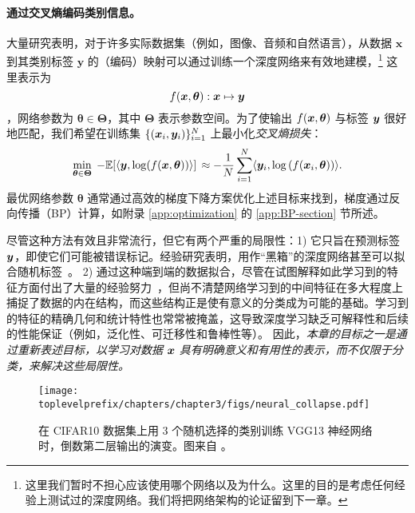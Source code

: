 \documentclass[../../book-main.tex]{subfiles}
\begin{document}
\paragraph{通过交叉熵编码类别信息。}  大量研究表明，对于许多实际数据集（例如，图像、音频和自然语言），从数据 $\bm{x}$ 到其类别标签 $\bm{y}$ 的（编码）映射可以通过训练一个深度网络来有效地建模，\footnote{这里我们暂时不担心应该使用哪个网络以及为什么。这里的目的是考虑任何经验上测试过的深度网络。我们将把网络架构的论证留到下一章。} 这里表示为 $$f(\bm{x}, \bm \theta):\bm{x} \mapsto \bm{y}$$，网络参数为 $\bm \theta \in \bm \Theta$，其中 $\bm \Theta$ 表示参数空间。为了使输出 $f(\bm{x}, \bm \theta)$ 与标签 $\bm{y}$ 很好地匹配，我们希望在训练集 $\{(\bm{x}_i, \bm{y}_i)\}_{i=1}^N$ 上最小化{\em 交叉熵损失}：
\begin{equation}
   \min_{\bm \theta \in \bm \Theta} \; - \mathbb{E}[\langle \bm{y}, \log(f(\bm{x}, \bm \theta)) \rangle] \, \approx - \frac{1}{N}\sum_{i=1}^N \langle \bm{y}_i, \log\left(f(\bm{x}_i, \bm \theta)\right) \rangle.
   \label{chap4-eqn:cross-entropy}
\end{equation}
最优网络参数 $\bm \theta $ 通常通过高效的梯度下降方案优化上述目标来找到，梯度通过反向传播（BP）计算，如附录 \ref{app:optimization} 的 \ref{app:BP-section} 节所述。

尽管这种方法有效且非常流行，但它有两个严重的局限性：1) 它只旨在预测标签 $\bm{y}$，即使它们可能被错误标记。经验研究表明，用作“黑箱”的深度网络甚至可以拟合随机标签~\cite{zhang2017understanding}。
2) 通过这种端到端的数据拟合，尽管在试图解释如此学习到的特征方面付出了大量的经验努力~\cite{Zeiler-ECCV2014}，但尚不清楚网络学习到的中间特征在多大程度上捕捉了数据的内在结构，而这些结构正是使有意义的分类成为可能的基础。学习到的特征的精确几何和统计特性也常常被掩盖，这导致深度学习缺乏可解释性和后续的性能保证（例如，泛化性、可迁移性和鲁棒性等）。
因此，{\em 本章的目标之一是通过重新表述目标，以学习对数据 $\bm{x}$ 具有明确意义和有用性的表示，而不仅限于分类，来解决这些局限性。}

\begin{figure}
	\centering
	\texttt{[image: \\toplevelprefix/chapters/chapter3/figs/neural\_collapse.pdf]}
	\caption{在 CIFAR10 数据集上用 3 个随机选择的类别训练 VGG13 神经网络时，倒数第二层输出的演变。图来自 \cite{papyan2020prevalence}。}
	\label{chap4-fig:neural-collapse}
\end{figure}
\end{document}
